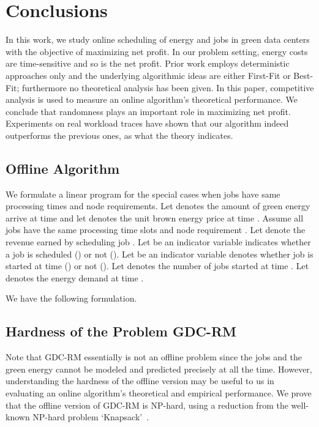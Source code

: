\documentclass[conference]{IEEEtran}
\begin{document}
\section{Conclusions}

In this work, we study online scheduling of energy and jobs in green data centers with the objective of maximizing net profit. In our problem setting, energy costs are time-sensitive and so is the net profit. Prior work employs deterministic approaches only and the underlying algorithmic ideas are either First-Fit or Best-Fit; furthermore no theoretical analysis has been given. In this paper, competitive analysis is used to measure an online algorithm's theoretical performance. We conclude that randomness plays an important role in maximizing net profit. Experiments on real workload traces have shown that our algorithm indeed outperforms the previous ones, as what the theory indicates.








\appendix
\renewcommand{\thesubsection}{\Alph{subsection}}



\subsection{Offline Algorithm}
\label{Appendix_offline}
We formulate a linear program for the special cases when jobs have same processing times and node requirements. Let  denotes the amount of green energy arrive at time  and let  denotes the unit brown energy price at time . Assume all jobs have the same processing time slots  and node requirement . Let  denote the revenue earned by scheduling job . Let  be an indicator variable indicates whether a job is scheduled () or not (). Let  be an indicator variable denotes whether job  is started at time  () or not (). Let  denotes the number of jobs started at time . Let  denotes the energy demand at time .

We have the following formulation.



\subsection{Hardness of the Problem GDC-RM}
\label{appendix_GDC-RM_hardness}
Note that GDC-RM essentially is not an offline problem since the jobs and the green energy cannot be modeled and predicted precisely at all the time. However, understanding the hardness of the offline version may be useful to us in evaluating an online algorithm's theoretical and empirical performance. We prove that the offline version of GDC-RM is NP-hard, using a reduction from the well-known NP-hard problem `Knapsack'~\cite{GareyJ79}.
\end{document}
